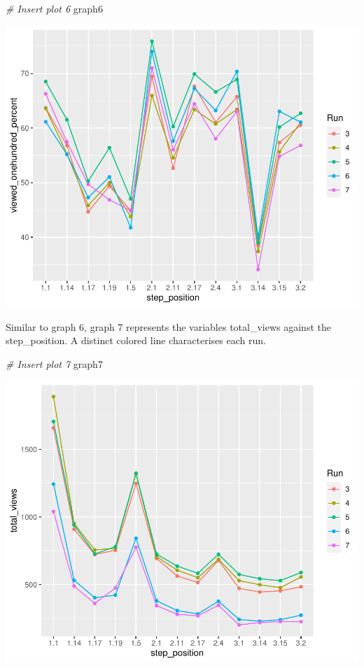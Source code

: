 \documentclass[12pt,]{article}
\newenvironment{Shaded}{\begin{snugshade}}{\end{snugshade}}
\newcommand{\CommentTok}[1]{\textcolor[rgb]{0.56,0.35,0.01}{\textit{#1}}}
\newcommand{\NormalTok}[1]{#1}
\begin{document}
\begin{Shaded}
\begin{Highlighting}[]
\CommentTok{\# Insert plot 6}
\NormalTok{graph6}
\end{Highlighting}
\end{Shaded}

\begin{center}\includegraphics{report_files/figure-latex/unnamed-chunk-8-1} \end{center}

Similar to graph 6, graph 7 represents the variables total\_views
against the step\_position. A distinct colored line characterises each
run.

\begin{Shaded}
\begin{Highlighting}[]
\CommentTok{\# Insert plot 7}
\NormalTok{graph7}
\end{Highlighting}
\end{Shaded}

\begin{center}\includegraphics{report_files/figure-latex/unnamed-chunk-9-1} \end{center}
\end{document}
